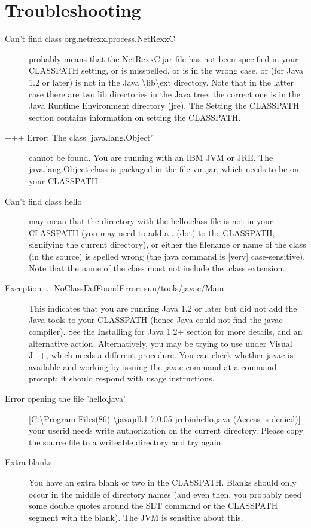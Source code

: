 \chapter{Troubleshooting\label{troubleshooting}}
\begin{description} 
\item[Can't find class org.netrexx.process.NetRexxC]
  probably means that the NetRexxC.jar file has not been specified in
  your CLASSPATH setting, or is misspelled, or is in the wrong case,
  or (for Java 1.2 or later) is not in the Java
  \textbackslash lib\textbackslash ext directory. Note that in the latter case there are two lib directories in the Java tree; the correct one is in the Java Runtime Environment directory (jre).
The Setting the CLASSPATH section contains information on setting the CLASSPATH.
\item[+++ Error: The class 'java.lang.Object'] cannot be found. You are running with an IBM JVM or JRE. The java.lang.Object class is packaged in the file vm.jar, which needs to be on your CLASSPATH
\item[Can't find class hello] may mean that the directory with the hello.class file is not in your CLASSPATH (you may need to add a . (dot) to the CLASSPATH, signifying the current directory), or either the filename or name of the class (in the source) is spelled wrong (the java command is [very] case-sensitive). Note that the name of the class must not include the .class extension.
\item[Exception ... NoClassDefFoundError: sun/tools/javac/Main] This indicates that you are running Java 1.2 or later but did not add the Java tools to your CLASSPATH (hence Java could not find the javac compiler). See the Installing for Java 1.2+ section for more details, and an alternative action.
Alternatively, you may be trying to use \nr{} under Visual J++, which needs a different procedure. You can check whether javac is available and working by issuing the javac command at a command prompt; it should respond with usage instructions.
\item[Error opening the file 'hello.java'][C:\textbackslash Program Files(86) \textbackslash javajdk1 7.0.05 jrebinhello.java (Access is denied)] - your userid needs write authorization on the current directory. Please copy the source file to a writeable directory and try again.
\item[Extra blanks] You have an extra blank or two in the CLASSPATH. Blanks should only occur in the middle of directory names (and even then, you probably need some double quotes around the SET command or the CLASSPATH segment with the blank). The JVM is sensitive about this.

\end{description}

